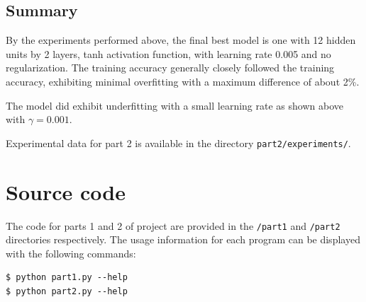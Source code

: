 \documentclass{article}
\begin{document}
\subsection{Summary}

By the experiments performed above, the final best model is one with 12 hidden units by 2 layers, tanh activation function, with learning rate 0.005 and no regularization. The training accuracy generally closely followed the training accuracy, exhibiting minimal overfitting with a maximum difference of about 2\%.

The model did exhibit underfitting with a small learning rate as shown above with $\gamma=0.001$.

Experimental data for part 2 is available in the directory \texttt{part2/experiments/}.

\section{Source code}

The code for parts 1 and 2 of project are provided in the \texttt{/part1} and \texttt{/part2} directories respectively.
The usage information for each program can be displayed with the following commands:
\begin{verbatim}
$ python part1.py --help
$ python part2.py --help
\end{verbatim}
\end{document}
